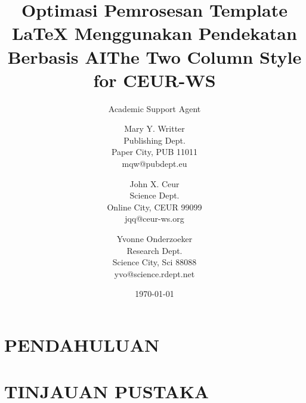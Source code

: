 \documentclass{article}
\title{Optimasi Pemrosesan Template LaTeX Menggunakan Pendekatan Berbasis AI}
\author{Academic Support Agent}
\date{\today}
\begin{document}
\maketitle

\begin{abstract}

\end{abstract}

\chapter{PENDAHULUAN}


\chapter{TINJAUAN PUSTAKA}


\usepackage{graphicx}
\usepackage{twocolceurws}


\title{The Two Column Style for CEUR-WS}

\author{
Mary Y. Writter \\ Publishing Dept.\\
                Paper City, PUB 11011 \\ mqw@pubdept.eu
\and
John X. Ceur \\ Science Dept.\\
                Online City, CEUR 99099 \\ jqq@ceur-ws.org
\and
Yvonne Onderzoeker \\ Research Dept.\\
                Science City, Sci 88088 \\ yvo@science.rdept.net
}

\institution{}
\end{document}
